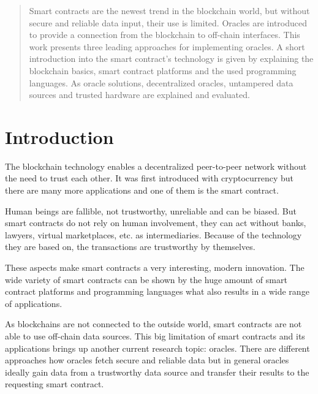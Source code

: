 \documentclass[conference]{IEEEtran}
\begin{document}
\begin{abstract}
Smart contracts are the newest trend in the blockchain world, but without secure and reliable data input, their use is limited. Oracles are introduced to provide a connection from the blockchain to off-chain interfaces. This work presents three leading approaches for implementing oracles. A short introduction into the smart contract's technology is given by explaining the blockchain basics, smart contract platforms and the used programming languages. As oracle solutions, decentralized oracles, untampered data sources and trusted hardware are explained and evaluated.
\end{abstract}





%
\IEEEpeerreviewmaketitle



\section{Introduction}
The blockchain technology enables a decentralized peer-to-peer network without the need to trust each other. It was first introduced with cryptocurrency but there are many more applications and one of them is the smart contract. \cite{Buterin2014} \par 
Human beings are fallible, not trustworthy, unreliable and can be biased. But smart contracts do not rely on human involvement, they can act without banks, lawyers, virtual marketplaces, etc. as intermediaries. Because of the technology they are based on, the transactions are trustworthy by themselves. \cite{Mik2017} \cite{Meitinger2017} \par 
These aspects make smart contracts a very interesting, modern innovation. The wide variety of smart contracts can be shown by the huge amount of smart contract platforms and programming languages what also results in a wide range of applications. \par
As blockchains are not connected to the outside world, smart contracts are not able to use off-chain data sources. This big limitation of smart contracts and its applications brings up another current research topic: oracles. There are different approaches how oracles fetch secure and reliable data but in general oracles ideally gain data from a trustworthy data source and transfer their results to the requesting smart contract. \cite{Mik2017} \cite{Ellis2017} 
\end{document}
